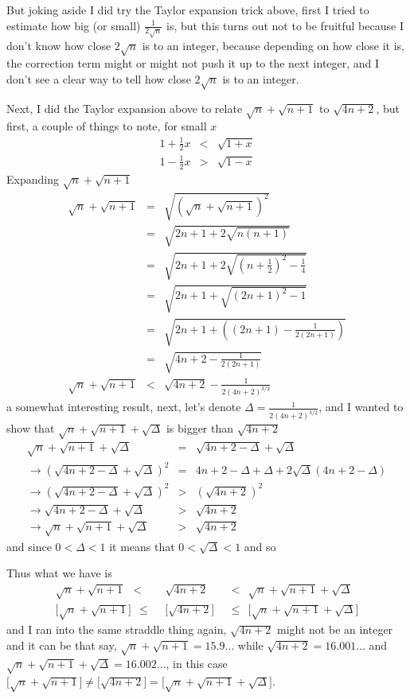 \documentclass[aps,preprint,preprintnumbers,nofootinbib,showpacs,prd]{revtex4-1}
\newcommand{\nbea}{\begin{eqnarray*}}
\newcommand{\neea}{\end{eqnarray*}}
\begin{document}
But joking aside I did try the Taylor expansion trick above, first I tried to estimate how big (or small) $\frac{1}{2\sqrt{n}}$ is, but this turns out not to be fruitful because I don't know how close $2\sqrt{n}$ is to an integer, because depending on how close it is, the correction term might or might not push it up to the next integer, and I don't see a clear way to tell how close $2\sqrt{n}$ is to an integer.

Next, I did the Taylor expansion above to relate $\sqrt{n} + \sqrt{n+1}$ to $\sqrt{4n+2}$, but first, a couple of things to note, for small $x$
%
\nbea
1 + \frac{1}{2}x & < & \sqrt{1+x} \\
1 - \frac{1}{2}x & > & \sqrt{1-x}
\neea
%
Expanding $\sqrt{n} + \sqrt{n+1}$
%
\nbea
\sqrt{n} + \sqrt{n+1} & = & \sqrt{\left (\sqrt{n} + \sqrt{n+1} \right )^2} \\
& = & \sqrt{2n + 1 + 2\sqrt{n(n+1)}} \\
& = & \sqrt{2n + 1 + 2\sqrt{\left (n+\frac{1}{2}\right )^2 - \frac{1}{4}}} \\
& = & \sqrt{2n + 1 + \sqrt{\left (2n+1\right )^2 - 1}} \\
& = & \sqrt{2n + 1 + \left((2n+1) -\frac{1}{2(2n+1)} \right)} \\
& = & \sqrt{4n + 2 -\frac{1}{2(2n+1)}} \\
\sqrt{n} + \sqrt{n+1} & < & \sqrt{4n+2} - \frac{1}{2(4n+2)^{3/2}}
\neea
%
a somewhat interesting result, next, let's denote $\Delta = \frac{1}{2(4n+2)^{3/2}}$, and I wanted to show that $\sqrt{n} + \sqrt{n+1} + \sqrt{\Delta}$ is bigger than $\sqrt{4n + 2}$
%
\nbea
\sqrt{n} + \sqrt{n+1} + \sqrt{\Delta} & = & \sqrt{4n + 2 -\Delta} + \sqrt{\Delta} \\
\to \left ( \sqrt{4n + 2 -\Delta} + \sqrt{\Delta} \right )^2 & = & 4n + 2 - \Delta + \Delta + 2\sqrt{\Delta}(4n + 2 - \Delta) \\
\to \left ( \sqrt{4n + 2 -\Delta} + \sqrt{\Delta} \right )^2 & > & \left ( \sqrt{4n + 2} \right )^2 \\
\to \sqrt{4n + 2 -\Delta} + \sqrt{\Delta} & > & \sqrt{4n + 2} \\
\to \sqrt{n} + \sqrt{n+1} + \sqrt{\Delta} & > & \sqrt{4n + 2}
\neea
%
and since $0 < \Delta < 1$ it means that $0 < \sqrt{\Delta}<1$ and so

Thus what we have is
%
\nbea
\sqrt{n} + \sqrt{n+1}~~ <~~ & \sqrt{4n + 2} & ~~<~~ \sqrt{n} + \sqrt{n+1} + \sqrt{\Delta} \\
\lbrack\sqrt{n} + \sqrt{n+1}\rbrack~~ \le~~ & \lbrack\sqrt{4n + 2}\rbrack & ~~\le~~ \lbrack\sqrt{n} + \sqrt{n+1} + \sqrt{\Delta}\rbrack
\neea
%
and I ran into the same straddle thing again, $\sqrt{4n + 2}$ might not be an integer and it can be that say, $\sqrt{n} + \sqrt{n+1} = 15.9\ldots$ while $\sqrt{4n + 2} = 16.001\ldots$ and $\sqrt{n} + \sqrt{n+1} + \sqrt{\Delta} = 16.002\ldots$, in this case $\lbrack\sqrt{n} + \sqrt{n+1}\rbrack \neq \lbrack\sqrt{4n + 2}\rbrack = \lbrack\sqrt{n} + \sqrt{n+1} + \sqrt{\Delta}\rbrack$.
\end{document}
